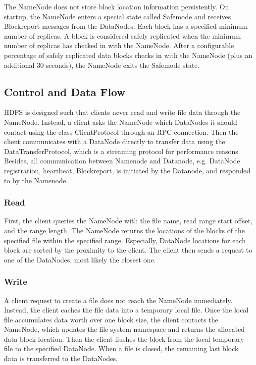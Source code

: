 \documentclass[11pt]{book}
\begin{document}
The NameNode does not store block location information persistently. On startup, the NameNode enters a special state called Safemode and receives Blockreport messages from the DataNodes. Each block has a specified minimum number of replicas. A block is considered safely replicated when the minimum number of replicas has checked in with the NameNode. After a configurable percentage of safely replicated data blocks checks in with the NameNode (plus an additional 30 seconds), the NameNode exits the Safemode state.

\subsection{Control and Data Flow}
HDFS is designed such that clients never read and write file data through the NameNode. Instead, a client asks the NameNode which DataNodes it should contact using the class ClientProtocol through an RPC connection. Then the client communicates with a DataNode directly to transfer data using the DataTransferProtocol, which is a streaming protocol for performance reasons. Besides, all communication between Namenode and Datanode, e.g. DataNode registration, heartbeat, Blockreport, is initiated by the Datanode, and responded to by the Namenode.

\subsubsection{Read}
First, the client queries the NameNode with the file name, read range start offset, and the range length. The NameNode returns the locations of the blocks of the specified file within the specified range. Especially, DataNode locations for each block are sorted by the proximity to the client. The client then sends a request to one of the DataNodes, most likely the closest one.

\subsubsection{Write}
A client request to create a file does not reach the NameNode immediately. Instead, the client caches the file data into a temporary local file. Once the local file accumulates data worth over one block size, the client contacts the NameNode, which updates the file system namespace and returns the allocated data block location. Then the client flushes the block from the local temporary file to the specified DataNode. When a file is closed, the remaining last block data is transferred to the DataNodes.
\end{document}
